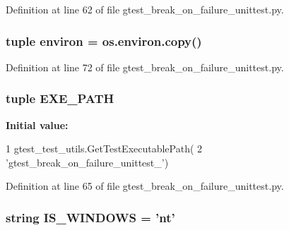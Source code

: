 \-Definition at line 62 of file gtest\-\_\-break\-\_\-on\-\_\-failure\-\_\-unittest.\-py.

\hypertarget{namespacegtest__break__on__failure__unittest_a199b463c0623b1b68e7b45e7b01fe16c}{
\subsubsection[{environ}]{\setlength{\rightskip}{0pt plus 5cm}tuple {\bf environ} = os.\-environ.\-copy()}}\label{d2/dcc/namespacegtest__break__on__failure__unittest_a199b463c0623b1b68e7b45e7b01fe16c}


\-Definition at line 72 of file gtest\-\_\-break\-\_\-on\-\_\-failure\-\_\-unittest.\-py.

\hypertarget{namespacegtest__break__on__failure__unittest_a216df3f485400b109390103528720888}{
\subsubsection[{\-E\-X\-E\-\_\-\-P\-A\-T\-H}]{\setlength{\rightskip}{0pt plus 5cm}tuple {\bf \-E\-X\-E\-\_\-\-P\-A\-T\-H}}}\label{d2/dcc/namespacegtest__break__on__failure__unittest_a216df3f485400b109390103528720888}
{\bfseries \-Initial value\-:}
\begin{DoxyCode}
1 gtest_test_utils.GetTestExecutablePath(
2     'gtest_break_on_failure_unittest_')
\end{DoxyCode}


\-Definition at line 65 of file gtest\-\_\-break\-\_\-on\-\_\-failure\-\_\-unittest.\-py.

\hypertarget{namespacegtest__break__on__failure__unittest_ab1b21b880253abfa3ab3dfc19b06814c}{
\subsubsection[{\-I\-S\-\_\-\-W\-I\-N\-D\-O\-W\-S}]{\setlength{\rightskip}{0pt plus 5cm}string {\bf \-I\-S\-\_\-\-W\-I\-N\-D\-O\-W\-S} = 'nt'}}\label{d2/dcc/namespacegtest__break__on__failure__unittest_ab1b21b880253abfa3ab3dfc19b06814c}


